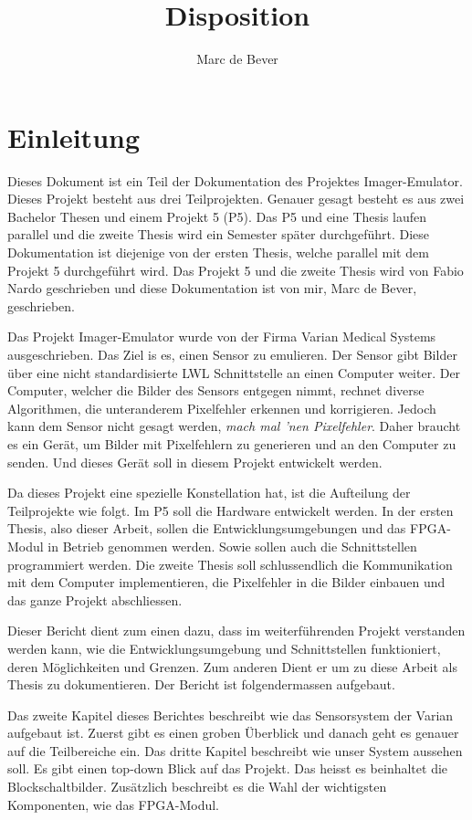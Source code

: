 \documentclass{article}
\title{Disposition}
\author{Marc de Bever}
\begin{document}
\maketitle
\tableofcontents

\section{Einleitung}
Dieses Dokument ist ein Teil der Dokumentation des Projektes Imager-Emu\-lator. Dieses Projekt besteht aus drei Teilprojekten. 
Genauer gesagt besteht es aus zwei Bachelor Thesen und einem Projekt 5 (P5). 
Das P5 und eine Thesis laufen parallel und die zweite Thesis wird ein Semester später durchgeführt. Diese Dokumentation ist diejenige von der ersten Thesis, welche parallel mit dem Projekt 5 durchgeführt wird. Das Projekt 5 und die zweite Thesis wird von Fabio Nardo geschrieben und diese Dokumentation ist von mir, Marc de Bever, geschrieben. 

Das Projekt Imager-Emulator wurde von der Firma Varian Medical Systems ausgeschrieben. Das Ziel is es, einen Sensor zu emulieren. Der Sensor gibt Bilder über eine nicht standardisierte LWL Schnittstelle an einen Computer weiter. Der Computer, welcher die Bilder des Sensors entgegen nimmt, rechnet diverse Algorithmen, die unteranderem Pixelfehler erkennen und korrigieren. Jedoch kann dem Sensor nicht gesagt werden, \textit{mach mal 'nen Pixelfehler}. Daher braucht es ein Gerät, um Bilder mit Pixelfehlern zu generieren und an den Computer zu senden. Und dieses Gerät soll in diesem Projekt entwickelt werden.

Da dieses Projekt eine spezielle Konstellation hat, ist die Aufteilung der Teilprojekte wie folgt. Im P5 soll die Hardware entwickelt werden. In der ersten Thesis, also dieser Arbeit, sollen die Entwicklungsumgebungen und das FPGA-Modul in Betrieb genommen werden. Sowie sollen auch die Schnittstellen programmiert werden. Die zweite Thesis soll schlussendlich die Kommunikation mit dem Computer implementieren, die Pixelfehler in die Bilder einbauen und das ganze Projekt abschliessen.

Dieser Bericht dient zum einen dazu, dass im weiterführenden Projekt verstanden werden kann, wie die Entwicklungsumgebung und Schnittstellen funktioniert, deren Möglichkeiten und Grenzen. Zum anderen Dient er um zu diese Arbeit als Thesis zu dokumentieren. Der Bericht ist folgendermassen aufgebaut.

Das zweite Kapitel dieses Berichtes beschreibt wie das Sensorsystem der Varian aufgebaut ist. Zuerst gibt es einen groben Überblick und danach geht es genauer auf die Teilbereiche ein.
Das dritte Kapitel beschreibt wie unser System aussehen soll. Es gibt einen top-down Blick auf das Projekt. Das heisst es beinhaltet die Blockschaltbilder. Zusätzlich beschreibt es die Wahl der wichtigsten Komponenten, wie das FPGA-Modul.
\end{document}
